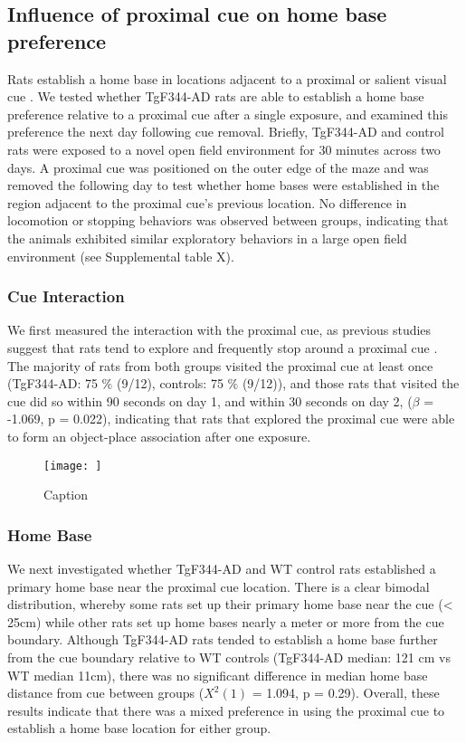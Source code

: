 \documentclass[fleqn,10pt]{wlscirep}
\begin{document}
\subsection*{Influence of proximal cue on home base preference}
Rats establish a home base in locations adjacent to a proximal or salient visual cue \cite{nemati_point_2007,hines_home_2005}. We tested whether TgF344-AD rats are able to establish a home base preference relative to a proximal cue after a single exposure, and examined this preference the next day following cue removal. Briefly, TgF344-AD and control rats were exposed to a novel open field environment for 30 minutes across two days. A proximal cue was positioned on the outer edge of the maze and was removed the following day to test whether home bases were established in the region adjacent to the proximal cue's previous location. No difference in locomotion or stopping behaviors was observed between groups, indicating that the animals exhibited similar exploratory behaviors in a large open field environment (see Supplemental table X).

\subsubsection*{Cue Interaction} 
We first measured the interaction with the proximal cue, as previous studies suggest that rats tend to explore and frequently stop around a proximal cue \cite{hines_home_2005,lehmann_complete_2007}. The majority of rats from both groups visited the proximal cue at least once (TgF344-AD: 75 $\%$ (9/12), controls: 75 $\%$ (9/12)), and those rats that visited the cue did so within 90 seconds on day 1, and within 30 seconds on day 2, ($\beta$ = -1.069, p = 0.022), indicating that rats that explored the proximal cue were able to form an object-place association after one exposure. 

\begin{figure}
    \centering
    \texttt{[image: ]}
    \caption{Caption}
    \label{homebase_fig}
\end{figure}

\subsubsection*{Home Base} 
We next investigated whether TgF344-AD and WT control rats established a primary home base near the proximal cue location. There is a clear bimodal distribution, whereby some rats set up their primary home base near the cue (< 25cm) while other rats set up home bases nearly a meter or more from the cue boundary. Although TgF344-AD rats tended to establish a home base further from the cue boundary relative to WT controls (TgF344-AD median: 121 cm vs WT median 11cm), there was no significant difference in median home base distance from cue between groups  ($X^2(1)$  = 1.094, p = 0.29). Overall, these results indicate that there was a mixed preference in using the proximal cue to establish a home base location for either group. 
\end{document}

